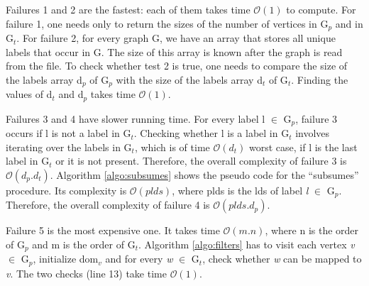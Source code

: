 \documentclass{l4proj}
\begin{document}
Failures 1 and 2 are the fastest: each of them takes time $\mathcal{O}(1)$ to compute. For failure 1, one needs only to return the sizes of the number of vertices in G$_{p}$ and in G$_{t}$. For failure 2, for every graph G, we have an array that stores all unique labels that occur in G. The size of this array is known after the graph is read from the file. To check whether test 2 is true, one needs to compare the size of the labels array d$_{p}$ of G$_{p}$ with the size of the labels array d$_{t}$ of G$_{t}$. Finding the values of d$_{t}$ and d$_{p}$ takes time $\mathcal{O}(1)$.

Failures 3 and 4 have slower running time. For every label l $\in$ G$_{p}$, failure 3 occurs if l is not a label in G$_{t}$. Checking whether l is a label in G$_{t}$ involves iterating over the labels in G$_{t}$, which is of time $\mathcal{O}(d_{t})$ worst case, if l is the last label in G$_{t}$ or it is not present. Therefore, the overall complexity of failure 3 is $\mathcal{O}(d_{p}.d_{t})$. Algorithm \ref{algo:subsumes} shows the pseudo code for the ``subsumes'' procedure. Its complexity is $\mathcal{O}(plds)$, where plds is the \gls{lds} of label \textit{l} $\in$ G$_{p}$. Therefore, the overall complexity of failure 4 is $\mathcal{O}(plds.d_{p})$.

Failure 5 is the most expensive one. It takes time $\mathcal{O}(m.n)$, where n is the order of G$_{p}$ and m is the order of G$_{t}$. Algorithm \ref{algo:filters} has to visit each vertex \textit{v} $\in$ G$_{p}$, initialize dom$_{v}$ and for every \textit{w} $\in$ G$_{t}$, check whether \textit{w} can be mapped to \textit{v}. The two checks (line 13) take time $\mathcal{O}(1)$.
\end{document}
